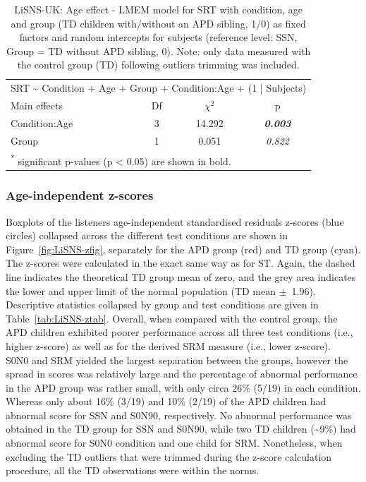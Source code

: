\documentclass[a4paper, twoside]{templates/ociamthesis}
\begin{document}
\begin{table}

\caption{\label{tab:LiSNS-AgeLMEMTab}LiSNS-UK: Age effect - LMEM model for SRT with condition, age and group (TD children with/without an APD sibling, 1/0) as fixed factors and random intercepts for subjects (reference level: SSN, Group = TD without APD sibling, 0). Note: only data measured with the control group (TD) following outliers trimming was included.}
\centering
\begin{tabular}[t]{lcc>{}c}
\toprule
\multicolumn{4}{c}{SRT \textasciitilde{} Condition + Age + Group + Condition:Age + (1 | Subjects)} \\
\cmidrule(l{3pt}r{3pt}){1-4}
Main effects & Df & $\chi^{2}$ & p\\
\midrule
Condition:Age & 3 & 14.292 & \em{\textbf{0.003}}\\
Group & 1 & 0.051 & \em{0.822}\\
\bottomrule
\multicolumn{4}{l}{\textsuperscript{*} significant p-values (p < 0.05) are shown in bold.}\\
\end{tabular}
\end{table}

\hypertarget{age-independent-z-scores-1}{%
\subsubsection*{Age-independent z-scores}\label{age-independent-z-scores-1}}

Boxplots of the listeners age-independent standardised residuals z-scores (blue circles) collapsed across the different test conditions are shown in Figure~\ref{fig:LiSNS-zfig}, separately for the APD group (red) and TD group (cyan). The z-scores were calculated in the exact same way as for ST. Again, the dashed line indicates the theoretical TD group mean of zero, and the grey area indicates the lower and upper limit of the normal population (TD mean \(\pm\)~1.96). Descriptive statistics collapsed by group and test conditions are given in Table~\ref{tab:LiSNS-ztab}. Overall, when compared with the control group, the APD children exhibited poorer performance across all three test conditions (i.e., higher z-score) as well as for the derived SRM measure (i.e., lower z-score).\\

S0N0 and SRM yielded the largest separation between the groups, however the spread in scores was relatively large and the percentage of abnormal performance in the APD group was rather small, with only circa 26\% (5/19) in each condition. Whereas only about 16\% (3/19) and 10\% (2/19) of the APD children had abnormal score for SSN and S0N90, respectively. No abnormal performance was obtained in the TD group for SSN and S0N90, while two TD children (\textasciitilde9\%) had abnormal score for S0N0 condition and one child for SRM. Nonetheless, when excluding the TD outliers that were trimmed during the z-score calculation procedure, all the TD observations were within the norms.\\
\end{document}
